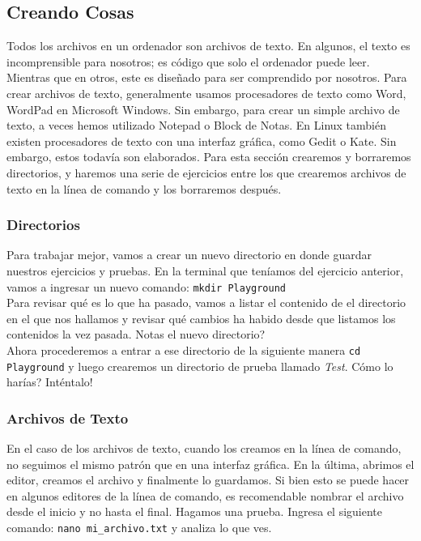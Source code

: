 \documentclass[10pt,letterpaper]{article}
\newcommand{\inlinecode}[1]{
\colorbox{light-gray}{\texttt{#1}}
}
\begin{document}
\subsection{Creando Cosas}
Todos los archivos en un ordenador son archivos de texto. En algunos, el texto es incomprensible para nosotros; es c\'odigo que solo el ordenador puede leer. Mientras que en otros, este es dise\~nado para ser comprendido por nosotros. Para crear archivos de texto, generalmente usamos procesadores de texto como Word, WordPad en Microsoft Windows. Sin embargo, para crear un simple archivo de texto, a veces hemos utilizado Notepad o Block de Notas. En Linux tambi\'en existen procesadores de texto con una interfaz gr\'afica, como Gedit o Kate. Sin embargo, estos todav\'ia son elaborados. Para esta secci\'on crearemos y borraremos directorios, y haremos una serie de ejercicios entre los que crearemos archivos de texto en la l\'inea de comando y los borraremos despu\'es.

\subsubsection{Directorios}
Para trabajar mejor, vamos a crear un nuevo directorio en donde guardar nuestros ejercicios y pruebas. En la terminal que ten\'iamos del ejercicio anterior, vamos a ingresar un nuevo comando: \inlinecode{mkdir Playground}\\

Para revisar qu\'e es lo que ha pasado, vamos a listar el contenido de el directorio en el que nos hallamos y revisar qu\'e cambios ha habido desde que listamos los contenidos la vez pasada. Notas el nuevo directorio?\\

Ahora procederemos a entrar a ese directorio de la siguiente manera \inlinecode{cd Playground} y luego crearemos un directorio de prueba llamado \emph{Test}. C\'omo lo har\'ias? Int\'entalo!

\subsubsection{Archivos de Texto}
En el caso de los archivos de texto, cuando los creamos en la l\'inea de comando, no seguimos el mismo patr\'on que en una interfaz gr\'afica. En la \'ultima, abrimos el editor, creamos el archivo y finalmente lo guardamos. Si bien esto se puede hacer en algunos editores de la l\'inea de comando, es recomendable nombrar el archivo desde el inicio y no hasta el final. Hagamos una prueba. Ingresa el siguiente comando: \inlinecode{nano mi\_archivo.txt} y analiza lo que ves.\\
\end{document}
